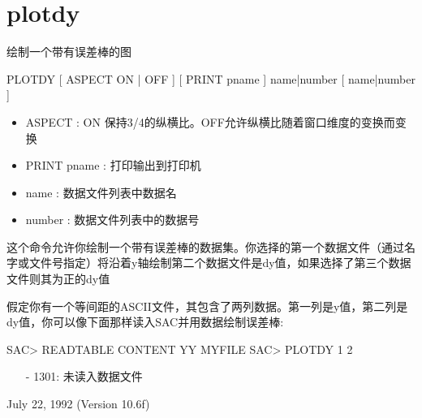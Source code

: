 \section{plotdy}
\label{cmd:plotdy}

绘制一个带有误差棒的图

PLOTDY [ ASPECT ON | OFF ] [ PRINT pname ] name|number [ name|number ]

\begin{itemize}
\item ASPECT  : ON 保持3/4的纵横比。OFF允许纵横比随着窗口维度的变换而变换 
\item PRINT {pname} : 打印输出到打印机 
\item name : 数据文件列表中数据名 
\item number : 数据文件列表中的数据号 
\end{itemize}

这个命令允许你绘制一个带有误差棒的数据集。你选择的第一个数据文件（通过名字或文件号指定）将沿着y轴绘制第二个数据文件是dy值，如果选择了第三个数据文件则其为正的dy值

假定你有一个等间距的ASCII文件，其包含了两列数据。第一列是y值，第二列是dy值，你可以像下面那样读入SAC并用数据绘制误差棒:
\begin{SACCode}
SAC> READTABLE CONTENT YY MYFILE
SAC> PLOTDY 1 2
\end{SACCode}

\begin{itemize}
\item[-]1301: 未读入数据文件
\end{itemize}

July 22, 1992 (Version 10.6f)

